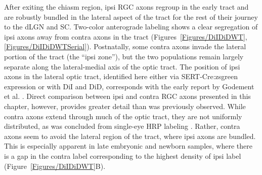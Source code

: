 After exiting the chiasm region, ipsi RGC axons regroup in the early tract and are robustly bundled in the lateral aspect of the tract for the rest of their journey to the dLGN and SC.
Two-color anterograde labeling shows a clear segregation of ipsi axons away from contra axons in the tract (Figures~\ref{Figures/DiIDiDWT}, \ref{Figures/DiIDiDWTSerial}).
Postnatally, some contra axons invade the lateral portion of the tract (the ``ipsi zone''), but the two populations remain largely separate along the lateral-medial axis of the optic tract.
The position of ipsi axons in the lateral optic tract, identified here either via SERT-Cre:zsgreen expression or with DiI and DiD, corresponds with the early report by Godement et al. .
Direct comparison between ipsi and contra RGC axons presented in this chapter, however, provides greater detail than was previously observed.
While contra axons extend through much of the optic tract, they are not uniformly distributed, as was concluded from single-eye HRP labeling \cite{godement1984prenatal}.
Rather, contra axons seem to avoid the lateral region of the tract, where ipsi axons are bundled.
This is especially apparent in late embryonic and newborn samples, where there is a gap in the contra label corresponding to the highest density of ipsi label (Figure~\ref{Figures/DiIDiDWT}B).

